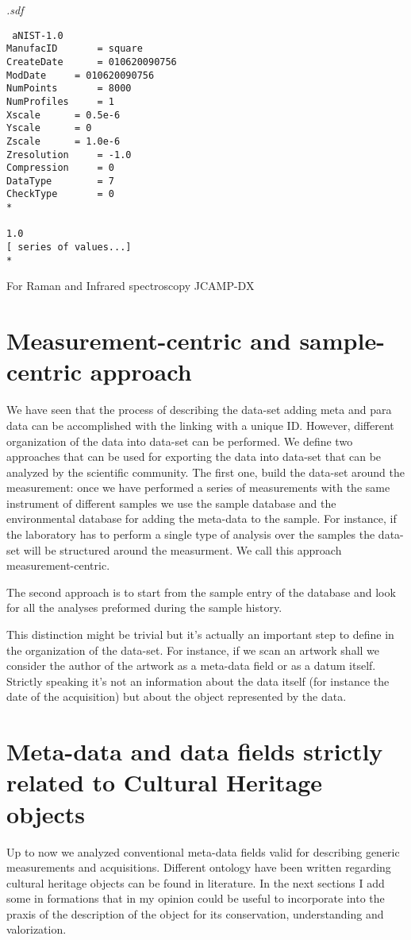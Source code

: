  
 \textit{.sdf}
 \begin{lstlisting}
 aNIST-1.0
ManufacID		= square
CreateDate		= 010620090756
ModDate		= 010620090756
NumPoints		= 8000
NumProfiles		= 1
Xscale		= 0.5e-6
Yscale		= 0
Zscale		= 1.0e-6
Zresolution		= -1.0
Compression		= 0
DataType		= 7
CheckType		= 0
*

1.0
[ series of values...]
*
 \end{lstlisting}


For Raman and Infrared spectroscopy
JCAMP-DX

\section{Measurement-centric and  sample-centric approach}
We have seen that the process of describing the data-set adding meta and para data can be accomplished with the linking with a unique ID. However, different organization of the data into data-set can be performed.
We define two approaches that can be used for exporting the data into data-set that can be analyzed by the scientific community. The first one, build the data-set around the measurement: once we have performed a series of measurements with the same instrument of different samples we use the sample database and the environmental database for adding the meta-data to the sample. For instance, if the laboratory has to perform a single type of analysis over the samples the data-set will be structured around the measurment. We call this approach measurement-centric. 

The second approach is to start from the sample entry of the database and look for all the analyses preformed during the sample history. 

This distinction might be trivial but it's actually an important step to define in the organization of the data-set. For instance, if we scan an artwork shall we consider the author of the artwork as a meta-data field or as a datum itself. Strictly speaking it's not an information about the data itself (for instance the date of the acquisition) but about the object represented by the data. 

\section{Meta-data and data fields strictly related to Cultural Heritage objects}
Up to now we analyzed conventional meta-data fields valid for describing generic measurements and acquisitions. Different ontology have been written regarding cultural heritage objects can be found in literature. In the next sections I add some in formations that in my opinion could be useful to incorporate into the praxis of the description of the object for its conservation, understanding and valorization.

